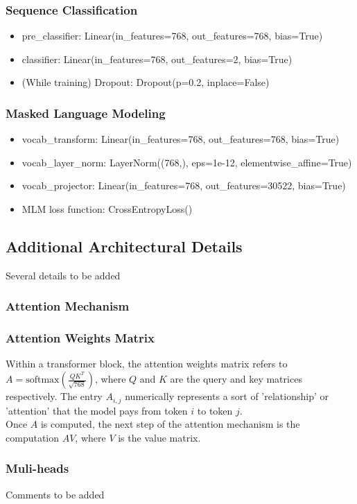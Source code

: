 \documentclass{article}
\begin{document}
\subsubsection*{Sequence Classification}

\begin{itemize}
\item pre\_classifier: Linear(in\_features=768, out\_features=768, bias=True)
\item classifier: Linear(in\_features=768, out\_features=2, bias=True)
\item (While training) Dropout: Dropout(p=0.2, inplace=False)
\end{itemize}

\subsubsection*{Masked Language Modeling}

\begin{itemize}
\item vocab\_transform: Linear(in\_features=768, out\_features=768, bias=True)
\item vocab\_layer\_norm: LayerNorm((768,), eps=1e-12, elementwise\_affine=True)
\item vocab\_projector: Linear(in\_features=768, out\_features=30522, bias=True)
\item MLM loss function: CrossEntropyLoss()
\end{itemize}

\subsection{Additional Architectural Details}

Several details to be added

\subsubsection{Attention Mechanism}

\subsubsection*{Attention Weights Matrix}

Within a transformer block, the attention weights matrix refers to $A = \text{softmax}\left(\frac{QK^T}{\sqrt{768}}\right)$, where $Q$ and $K$ are the query and key matrices respectively.  The entry $A_{i,j}$ numerically  represents a sort of 'relationship' or 'attention' that the model pays from token $i$ to token $j$.  \\

Once $A$ is computed, the next step of the attention mechanism is the computation $AV$, where $V$ is the value matrix.

\subsubsection*{Muli-heads}

Comments to be added




 
\end{document}
